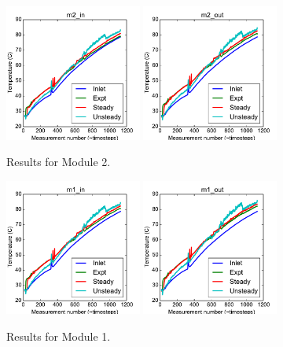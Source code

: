 \documentclass{article}
\begin{document}
\clearpage
\begin{figure}[!ht]
\centering
\includegraphics[width=0.4\textwidth]{../../data/ICSolar/images/Feb27_m2_in_compare.pdf}\hspace{0.05\textwidth}
\includegraphics[width=0.4\textwidth]{../../data/ICSolar/images/Feb27_m2_out_compare.pdf}\hspace{0.05\textwidth}\\
\caption{Results for Module 2.}\end{figure}
\begin{figure}[!ht]
\centering
\includegraphics[width=0.4\textwidth]{../../data/ICSolar/images/Feb27_m1_in_compare.pdf}\hspace{0.05\textwidth}
\includegraphics[width=0.4\textwidth]{../../data/ICSolar/images/Feb27_m1_out_compare.pdf}\hspace{0.05\textwidth}\\
\caption{Results for Module 1.}\end{figure}
\end{document}
